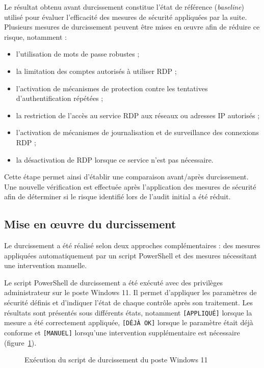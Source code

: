 Le résultat obtenu avant durcissement constitue l'état de référence (\emph{baseline}) utilisé pour évaluer l'efficacité des mesures de sécurité appliquées par la suite. Plusieurs mesures de durcissement peuvent être mises en œuvre afin de réduire ce risque, notamment :
\begin{itemize}
  \item l'utilisation de mots de passe robustes ;
  \item la limitation des comptes autorisés à utiliser RDP ;
  \item l'activation de mécanismes de protection contre les tentatives d'authentification répétées ;
  \item la restriction de l'accès au service RDP aux réseaux ou adresses IP autorisés ;
  \item l'activation de mécanismes de journalisation et de surveillance des connexions RDP ;
  \item la désactivation de RDP lorsque ce service n'est pas nécessaire.
\end{itemize}
Cette étape permet ainsi d'établir une comparaison avant/après durcissement. Une nouvelle vérification est effectuée après l'application des mesures de sécurité afin de déterminer si le risque identifié lors de l'audit initial a été réduit.

\subsection{Mise en œuvre du durcissement}

Le durcissement a été réalisé selon deux approches complémentaires : des mesures appliquées automatiquement par un script PowerShell et des mesures nécessitant une intervention manuelle.

Le script PowerShell de durcissement a été exécuté avec des privilèges administrateur sur le poste Windows 11. Il permet d'appliquer les paramètres de sécurité définis et d'indiquer l'état de chaque contrôle après son traitement. Les résultats sont présentés sous différents états, notamment \texttt{[APPLIQUÉ]} lorsque la mesure a été correctement appliquée, \texttt{[DÉJÀ OK]} lorsque le paramètre était déjà conforme et \texttt{[MANUEL]} lorsqu'une intervention supplémentaire est nécessaire (figure~\ref{fig:win-script}).

\begin{figure}[htbp]
\centering
{}
\caption{Exécution du script de durcissement du poste Windows 11}
\label{fig:win-script}
\end{figure}

